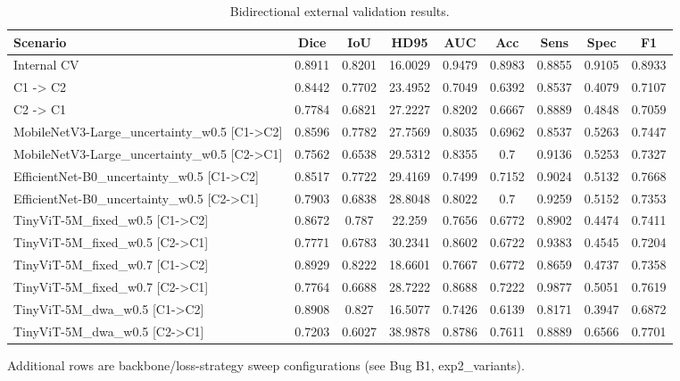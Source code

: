 \begin{table}[htbp]
  \centering
  \caption{Bidirectional external validation results.}
  \label{tab:external_val}
  \begin{tabular}{lcccccccc}
    \toprule
    Scenario & Dice & IoU & HD95 & AUC & Acc & Sens & Spec & F1 \\
    \midrule
    Internal CV & 0.8911 & 0.8201 & 16.0029 & 0.9479 & 0.8983 & 0.8855 & 0.9105 & 0.8933 \\
    C1 -> C2 & 0.8442 & 0.7702 & 23.4952 & 0.7049 & 0.6392 & 0.8537 & 0.4079 & 0.7107 \\
    C2 -> C1 & 0.7784 & 0.6821 & 27.2227 & 0.8202 & 0.6667 & 0.8889 & 0.4848 & 0.7059 \\
    MobileNetV3-Large_uncertainty_w0.5 [C1->C2] & 0.8596 & 0.7782 & 27.7569 & 0.8035 & 0.6962 & 0.8537 & 0.5263 & 0.7447 \\
    MobileNetV3-Large_uncertainty_w0.5 [C2->C1] & 0.7562 & 0.6538 & 29.5312 & 0.8355 & 0.7 & 0.9136 & 0.5253 & 0.7327 \\
    EfficientNet-B0_uncertainty_w0.5 [C1->C2] & 0.8517 & 0.7722 & 29.4169 & 0.7499 & 0.7152 & 0.9024 & 0.5132 & 0.7668 \\
    EfficientNet-B0_uncertainty_w0.5 [C2->C1] & 0.7903 & 0.6838 & 28.8048 & 0.8022 & 0.7 & 0.9259 & 0.5152 & 0.7353 \\
    TinyViT-5M_fixed_w0.5 [C1->C2] & 0.8672 & 0.787 & 22.259 & 0.7656 & 0.6772 & 0.8902 & 0.4474 & 0.7411 \\
    TinyViT-5M_fixed_w0.5 [C2->C1] & 0.7771 & 0.6783 & 30.2341 & 0.8602 & 0.6722 & 0.9383 & 0.4545 & 0.7204 \\
    TinyViT-5M_fixed_w0.7 [C1->C2] & 0.8929 & 0.8222 & 18.6601 & 0.7667 & 0.6772 & 0.8659 & 0.4737 & 0.7358 \\
    TinyViT-5M_fixed_w0.7 [C2->C1] & 0.7764 & 0.6688 & 28.7222 & 0.8688 & 0.7222 & 0.9877 & 0.5051 & 0.7619 \\
    TinyViT-5M_dwa_w0.5 [C1->C2] & 0.8908 & 0.827 & 16.5077 & 0.7426 & 0.6139 & 0.8171 & 0.3947 & 0.6872 \\
    TinyViT-5M_dwa_w0.5 [C2->C1] & 0.7203 & 0.6027 & 38.9878 & 0.8786 & 0.7611 & 0.8889 & 0.6566 & 0.7701 \\
    \bottomrule
  \end{tabular}
  \vspace{2pt}
  \footnotesize{Additional rows are backbone/loss-strategy sweep configurations (see Bug B1, exp2_variants).}
\end{table}